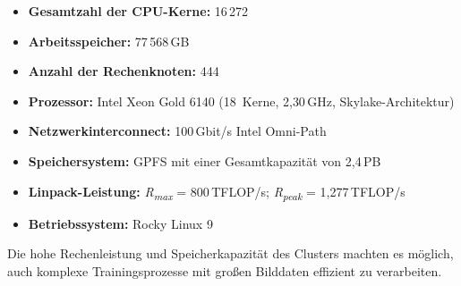 \begin{itemize}
    \item \textbf{Gesamtzahl der CPU-Kerne:} 16\,272
    \item \textbf{Arbeitsspeicher:} 77\,568\,GB
    \item \textbf{Anzahl der Rechenknoten:} 444
    \item \textbf{Prozessor:} Intel Xeon Gold 6140 (18~Kerne, 2{,}30\,GHz, Skylake-Architektur)
    \item \textbf{Netzwerkinterconnect:} 100\,Gbit/s Intel Omni-Path
    \item \textbf{Speichersystem:} GPFS mit einer Gesamtkapazität von 2{,}4\,PB
    \item \textbf{Linpack-Leistung:} \textit{R\textsubscript{max}} = 800\,TFLOP/s; \textit{R\textsubscript{peak}} = 1{,}277\,TFLOP/s
    \item \textbf{Betriebssystem:} Rocky Linux 9
\end{itemize}

Die hohe Rechenleistung und Speicherkapazität des Clusters machten es möglich, auch komplexe Trainingsprozesse mit großen Bilddaten effizient zu verarbeiten.


